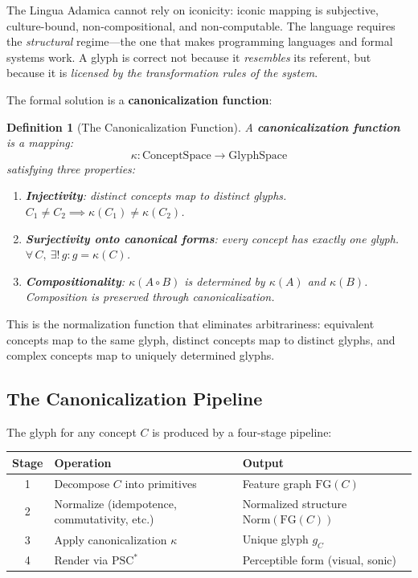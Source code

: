 \documentclass[12pt, letterpaper]{book}
\def\equiv{=}%
\def\mathfrak#1{#1}%
\newtheorem{definition}{Definition}[chapter]
\begin{document}
The Lingua Adamica cannot rely on iconicity: iconic mapping is subjective, culture-bound, non-compositional, and non-computable. The language requires the \textit{structural} regime---the one that makes programming languages and formal systems work. A glyph is correct not because it \textit{resembles} its referent, but because it is \textit{licensed by the transformation rules of the system}.

The formal solution is a \textbf{canonicalization function}:

\begin{definition}[The Canonicalization Function]\label{def:canon}
A \textbf{canonicalization function} is a mapping:
\[
\kappa: \mathrm{ConceptSpace} \to \mathrm{GlyphSpace}
\]
satisfying three properties:
\begin{enumerate}[label=(\roman*)]
    \item \textbf{Injectivity}: distinct concepts map to distinct glyphs. $C_1 \not\equiv C_2 \implies \kappa(C_1) \not\equiv \kappa(C_2)$.
    \item \textbf{Surjectivity onto canonical forms}: every concept has exactly one glyph. $\forall\, C,\ \exists!\, \mathfrak{g}: \mathfrak{g} = \kappa(C)$.
    \item \textbf{Compositionality}: $\kappa(A \circ B)$ is determined by $\kappa(A)$ and $\kappa(B)$. Composition is preserved through canonicalization.
\end{enumerate}
\end{definition}

This is the normalization function that eliminates arbitrariness: equivalent concepts map to the same glyph, distinct concepts map to distinct glyphs, and complex concepts map to uniquely determined glyphs.

\subsection{The Canonicalization Pipeline}

The glyph for any concept $C$ is produced by a four-stage pipeline:

\begin{center}
\small
\begin{tabular}{cl p{6.5cm}}
\toprule
\textbf{Stage} & \textbf{Operation} & \textbf{Output} \\
\midrule
1 & Decompose $C$ into primitives & Feature graph $\mathrm{FG}(C)$ \\
2 & Normalize (idempotence, commutativity, etc.) & Normalized structure $\mathrm{Norm}(\mathrm{FG}(C))$ \\
3 & Apply canonicalization $\kappa$ & Unique glyph $\mathfrak{g}_C$ \\
4 & Render via $\mathrm{PSC}^*$ & Perceptible form (visual, sonic) \\
\bottomrule
\end{tabular}
\end{center}
\end{document}
